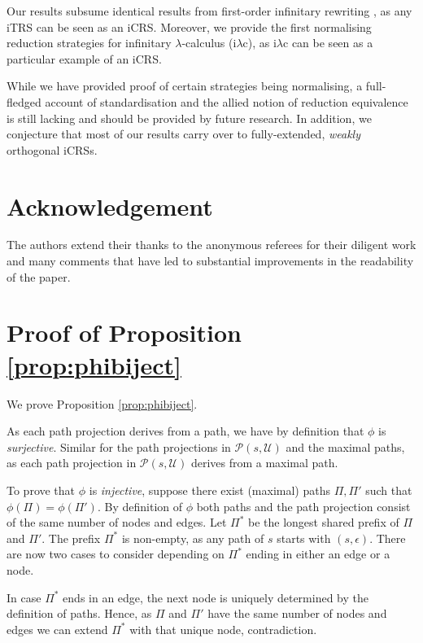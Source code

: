 \documentclass{LMCS}
\theoremstyle{definition}
\newcommand{\apath}{\Pi}
\newcommand{\iLC}{i$\lambda$c\xspace}
\begin{document}
Our results subsume identical results from first-order infinitary rewriting \cite{KKSV95}, as any iTRS can be seen as an iCRS. Moreover, we provide the first normalising reduction strategies for infinitary $\lambda$-calculus (\iLC), as \iLC can be seen as a particular example of an iCRS.

While we have provided proof of certain strategies being normalising, a full-fledged account of standardisation and the allied notion of reduction equivalence \cite{T03_OV_equiv} is still lacking and should be provided by future research. In addition, we conjecture that most of our results carry over to fully-extended, \emph{weakly} orthogonal iCRSs.

\section*{Acknowledgement}

The authors extend their thanks to the anonymous referees for their diligent work and many comments
that have led to substantial improvements in the readability of the paper.





\newpage

\appendix

\section{Proof of Proposition \ref{prop:phibiject}}\label{app:proof_III}

We prove Proposition \ref{prop:phibiject}.

\proof
As each path projection derives from a path, we have by definition
that $\phi$ is \emph{surjective}. Similar for the path projections
in $\mathcal{P}(s, \mathcal{U})$ and the maximal paths, as each path projection
in $\mathcal{P}(s, \mathcal{U})$ derives from a maximal path.

To prove that $\phi$ is \emph{injective}, suppose there exist (maximal) paths
$\apath, \apath'$ such that $\phi(\apath) = \phi(\apath')$. By definition
of $\phi$ both paths and the path projection consist of the same number of
nodes and edges. Let $\apath^*$ be the longest shared prefix of $\apath$ and
$\apath'$. The prefix $\apath^*$ is non-empty, as any path of $s$ starts
with $(s, \epsilon)$. There are now two cases to consider depending on
$\apath^*$ ending in either an edge or a node.

In case $\apath^*$ ends in an edge, the next node is uniquely determined
by the definition of paths. Hence, as $\apath$ and $\apath'$ have the
same number of nodes and edges we can extend $\apath^*$ with that unique node,
contradiction.
\end{document}
